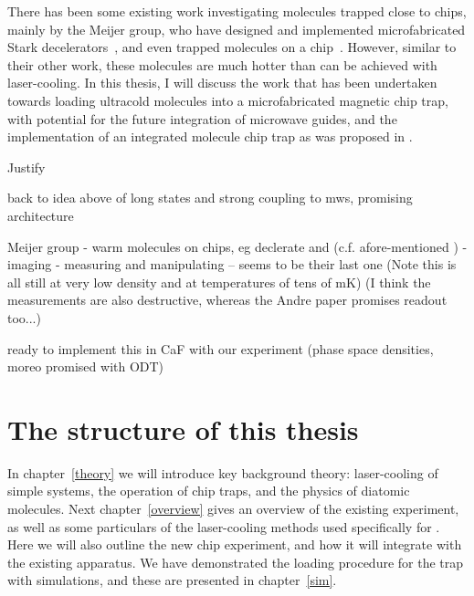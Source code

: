 There has been some existing work investigating molecules trapped close to
chips, mainly by the Meijer group, who have designed and implemented
microfabricated Stark decelerators~\cite{}, and even trapped molecules on a
chip~\cite{}. However, similar to their other work, these molecules are much
hotter than can be achieved with laser-cooling. In this thesis, I will discuss
the work that has been undertaken towards loading ultracold \CaF{} molecules
into a microfabricated magnetic chip trap, with potential for the future
integration of microwave guides, and the implementation of an integrated
molecule chip trap as was proposed in .



Justify

back to idea above of long states and strong coupling to mws, promising
architecture \cite{Andre2006}

Meijer group
- warm molecules on chips, eg declerate \cite{Meek2008} and \cite{Meek2009}
(c.f. afore-mentioned \cite{Bethlem1999})
- imaging \cite{Marx2013}
- measuring and manipulating \cite{PhysRevA.92.063408} -- seems to be their
last one
(Note this is all still at very low density and at temperatures of tens of mK)
(I think the measurements are also destructive, whereas the Andre paper
promises readout too...)


ready to implement this in CaF with our experiment (phase space densities,
moreo promised with ODT)

\section{The structure of this thesis}

In chapter~\ref{theory} we will introduce key background theory: 
laser-cooling of simple systems, the operation of chip traps, and the physics
of diatomic molecules. Next chapter~\ref{overview} gives an overview of the
existing \CaF{} experiment, as well as some particulars of the laser-cooling
methods used specifically for \CaF{}. Here we will also outline the new chip
experiment, and how it will integrate with the existing apparatus. We have
demonstrated the loading procedure for the trap with simulations, and these are
presented in chapter~\ref{sim}.

